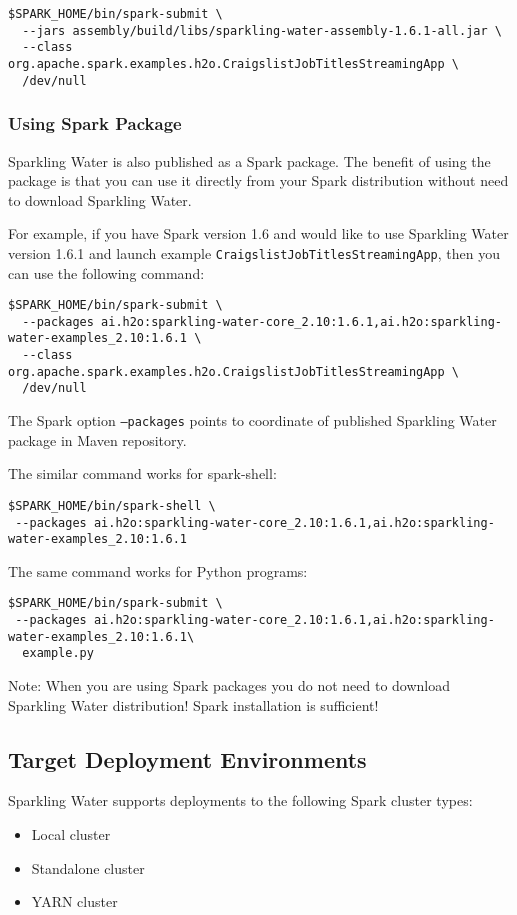 \pagebreak
\begin{lstlisting}[style=Bash]
$SPARK_HOME/bin/spark-submit \
  --jars assembly/build/libs/sparkling-water-assembly-1.6.1-all.jar \
  --class org.apache.spark.examples.h2o.CraigslistJobTitlesStreamingApp \
  /dev/null
\end{lstlisting}

\subsubsection{Using Spark Package}

Sparkling Water is also published as a Spark package. The benefit of using the package is that you can use it directly from your Spark distribution without need to download Sparkling Water.

For example, if you have Spark version 1.6 and would like to use Sparkling Water version 1.6.1 and launch example \texttt{CraigslistJobTitlesStreamingApp}, then you can use the following command:

\begin{lstlisting}[style=Bash]
$SPARK_HOME/bin/spark-submit \
  --packages ai.h2o:sparkling-water-core_2.10:1.6.1,ai.h2o:sparkling-water-examples_2.10:1.6.1 \
  --class org.apache.spark.examples.h2o.CraigslistJobTitlesStreamingApp \
  /dev/null
\end{lstlisting}

The Spark option \texttt{--packages} points to coordinate of published Sparkling Water package in Maven repository.

The similar command works for spark-shell:

\begin{lstlisting}[style=Bash]
$SPARK_HOME/bin/spark-shell \
 --packages ai.h2o:sparkling-water-core_2.10:1.6.1,ai.h2o:sparkling-water-examples_2.10:1.6.1 
\end{lstlisting}

The same command works for Python programs:

\begin{lstlisting}[style=Bash]
$SPARK_HOME/bin/spark-submit \
 --packages ai.h2o:sparkling-water-core_2.10:1.6.1,ai.h2o:sparkling-water-examples_2.10:1.6.1\
  example.py
\end{lstlisting}

Note: When you are using Spark packages you do not need to download Sparkling Water distribution! Spark installation is sufficient!

\subsection{Target Deployment Environments}
Sparkling Water supports deployments to the following Spark cluster types:
\begin{itemize}
	\item{Local cluster}
	\item{Standalone cluster} 
	\item{YARN cluster}
\end{itemize}

